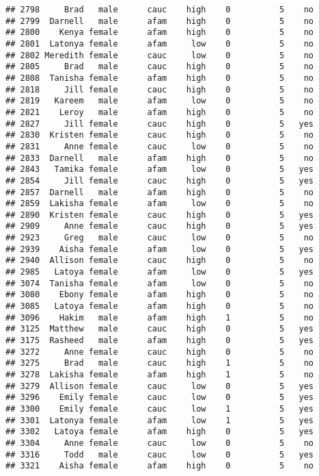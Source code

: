\documentclass[
]{article}
\begin{document}
\begin{verbatim}
## 2798     Brad   male      cauc    high    0          5    no
## 2799  Darnell   male      afam    high    0          5    no
## 2800    Kenya female      afam    high    0          5    no
## 2801  Latonya female      afam     low    0          5    no
## 2802 Meredith female      cauc     low    0          5    no
## 2805     Brad   male      cauc    high    0          5    no
## 2808  Tanisha female      afam    high    0          5    no
## 2818     Jill female      cauc    high    0          5    no
## 2819   Kareem   male      afam     low    0          5    no
## 2821    Leroy   male      afam    high    0          5    no
## 2827     Jill female      cauc    high    0          5   yes
## 2830  Kristen female      cauc    high    0          5    no
## 2831     Anne female      cauc     low    0          5    no
## 2833  Darnell   male      afam    high    0          5    no
## 2843   Tamika female      afam     low    0          5   yes
## 2854     Jill female      cauc    high    0          5   yes
## 2857  Darnell   male      afam    high    0          5    no
## 2859  Lakisha female      afam     low    0          5    no
## 2890  Kristen female      cauc    high    0          5   yes
## 2909     Anne female      cauc    high    0          5   yes
## 2923     Greg   male      cauc     low    0          5    no
## 2939    Aisha female      afam     low    0          5   yes
## 2940  Allison female      cauc    high    0          5    no
## 2985   Latoya female      afam     low    0          5   yes
## 3074  Tanisha female      afam     low    0          5    no
## 3080    Ebony female      afam    high    0          5    no
## 3085   Latoya female      afam    high    0          5    no
## 3096    Hakim   male      afam    high    1          5    no
## 3125  Matthew   male      cauc    high    0          5   yes
## 3175  Rasheed   male      afam    high    0          5   yes
## 3272     Anne female      cauc    high    0          5    no
## 3275     Brad   male      cauc    high    1          5    no
## 3278  Lakisha female      afam    high    1          5    no
## 3279  Allison female      cauc     low    0          5   yes
## 3296    Emily female      cauc     low    0          5   yes
## 3300    Emily female      cauc     low    1          5   yes
## 3301  Latonya female      afam     low    1          5   yes
## 3302   Latoya female      afam    high    0          5   yes
## 3304     Anne female      cauc     low    0          5    no
## 3316     Todd   male      cauc     low    0          5   yes
## 3321    Aisha female      afam    high    0          5    no

\end{verbatim}
\end{document}
